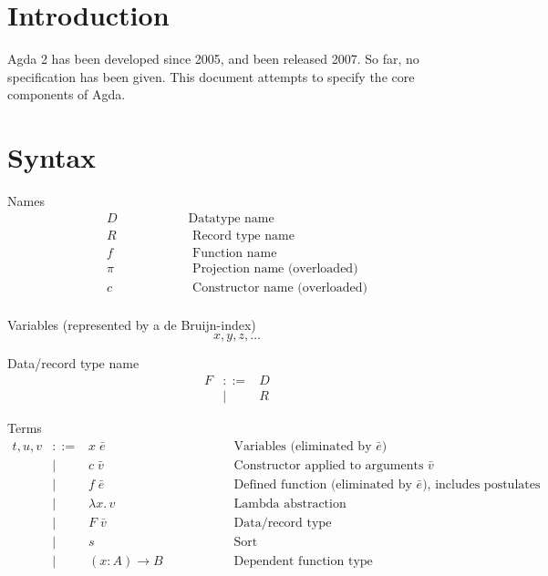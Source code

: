 \documentclass[acmlarge]{acmart}\settopmatter{}
\renewcommand{\|}{|}
\begin{document}
\section{Introduction}

Agda 2 has been developed since 2005, and been released 2007.  So far,
no specification has been given.  This document attempts to specify
the core components of Agda.


\section{Syntax}
\label{sec:syntax}

\newcommand{\bang}{\,!\,}
\newcommand{\twobang}{\,!!\,}


Names
\[
\begin{array}{ll}
D   & \hspace{2cm}\text{Datatype name} \\
  R & \hspace{2cm}\text{   Record type name} \\
  f & \hspace{2cm}\text{   Function name} \\
\pi & \hspace{2cm}\text{  Projection name  (overloaded)} \\
  c & \hspace{2cm}\text{   Constructor name (overloaded)} \\
\end{array}
\]

Variables (represented by a de Bruijn-index)
\[
x,y,z, \hdots
\]

Data/record type name
\[
\begin{array}{lrl}
F &::= & D \\& |& R
\end{array}
\]

Terms
\[
\begin{array}{lrll}
t, u, v &::=& x\; \bar{e}            & \hspace{2cm}\text{Variables (eliminated by $\bar{e}$)} \\
          &|& c\; \bar{v}            & \hspace{2cm}\text{Constructor applied to arguments $\bar{v}$} \\
          &|& f\; \bar{e}            & \hspace{2cm}\text{Defined function (eliminated by $\bar{e}$), includes postulates} \\
          &|& \lambda x.\, v           & \hspace{2cm}\text{Lambda abstraction} \\
          &|& F\; \bar{v}            & \hspace{2cm}\text{Data/record type} \\
          &|& s               & \hspace{2cm}\text{Sort} \\
          &|& (x : A) \rightarrow B      & \hspace{2cm}\text{Dependent function type} \\
\end{array}
\]
\end{document}
